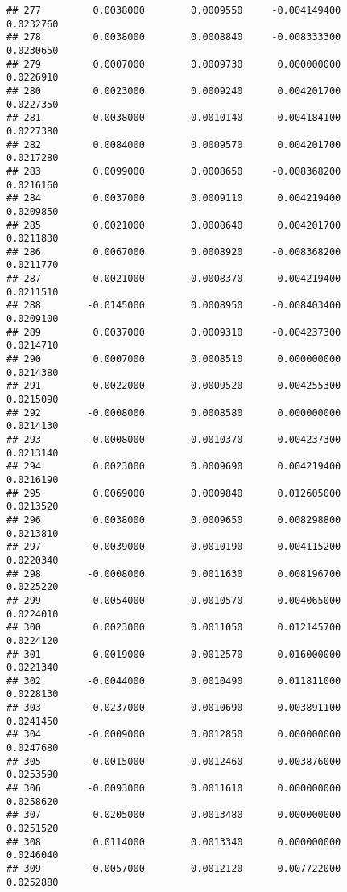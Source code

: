 \documentclass[
]{article}
\begin{document}
\begin{verbatim}
## 277         0.0038000        0.0009550     -0.004149400             0.0232760
## 278         0.0038000        0.0008840     -0.008333300             0.0230650
## 279         0.0007000        0.0009730      0.000000000             0.0226910
## 280         0.0023000        0.0009240      0.004201700             0.0227350
## 281         0.0038000        0.0010140     -0.004184100             0.0227380
## 282         0.0084000        0.0009570      0.004201700             0.0217280
## 283         0.0099000        0.0008650     -0.008368200             0.0216160
## 284         0.0037000        0.0009110      0.004219400             0.0209850
## 285         0.0021000        0.0008640      0.004201700             0.0211830
## 286         0.0067000        0.0008920     -0.008368200             0.0211770
## 287         0.0021000        0.0008370      0.004219400             0.0211510
## 288        -0.0145000        0.0008950     -0.008403400             0.0209100
## 289         0.0037000        0.0009310     -0.004237300             0.0214710
## 290         0.0007000        0.0008510      0.000000000             0.0214380
## 291         0.0022000        0.0009520      0.004255300             0.0215090
## 292        -0.0008000        0.0008580      0.000000000             0.0214130
## 293        -0.0008000        0.0010370      0.004237300             0.0213140
## 294         0.0023000        0.0009690      0.004219400             0.0216190
## 295         0.0069000        0.0009840      0.012605000             0.0213520
## 296         0.0038000        0.0009650      0.008298800             0.0213810
## 297        -0.0039000        0.0010190      0.004115200             0.0220340
## 298        -0.0008000        0.0011630      0.008196700             0.0225220
## 299         0.0054000        0.0010570      0.004065000             0.0224010
## 300         0.0023000        0.0011050      0.012145700             0.0224120
## 301         0.0019000        0.0012570      0.016000000             0.0221340
## 302        -0.0044000        0.0010490      0.011811000             0.0228130
## 303        -0.0237000        0.0010690      0.003891100             0.0241450
## 304        -0.0009000        0.0012850      0.000000000             0.0247680
## 305        -0.0015000        0.0012460      0.003876000             0.0253590
## 306        -0.0093000        0.0011610      0.000000000             0.0258620
## 307         0.0205000        0.0013480      0.000000000             0.0251520
## 308         0.0114000        0.0013340      0.000000000             0.0246040
## 309        -0.0057000        0.0012120      0.007722000             0.0252880

\end{verbatim}
\end{document}
